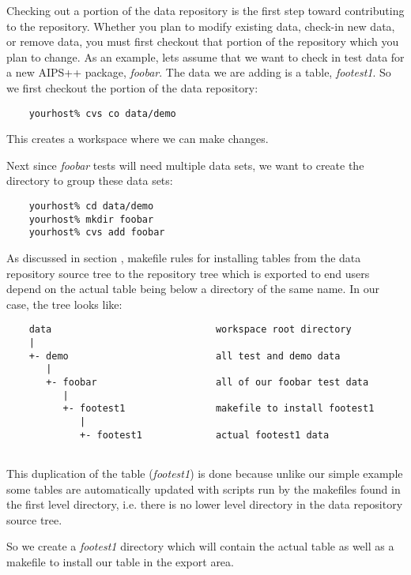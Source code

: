 Checking out a portion of the data repository is the first step toward
contributing to the repository. Whether you plan to modify existing
data, check-in new data, or remove data, you must first checkout that
portion of the repository which you plan to change. As an example, lets
assume that we want to check in test data for a new AIPS++ package,
\textit{foobar}. The data we are adding is a table, \textit{footest1}.
So we first checkout the  portion of the data repository:

\begin{verbatim}
    yourhost% cvs co data/demo
\end{verbatim}

\noindent
This creates a workspace where we can make changes.

Next since \textit{foobar} tests will need multiple data sets, we want to
create the directory to group these data sets:

\begin{verbatim}
    yourhost% cd data/demo
    yourhost% mkdir foobar
    yourhost% cvs add foobar
\end{verbatim}

As discussed in section , makefile rules
for installing tables from the data repository source tree to the repository
tree which is exported to end users depend on the actual table being below
a directory of the same name. In our case, the tree looks like:

\begin{verbatim}
    data                             workspace root directory
    |
    +- demo                          all test and demo data
       |
       +- foobar                     all of our foobar test data
          |
          +- footest1                makefile to install footest1
             |
             +- footest1             actual footest1 data
                     
\end{verbatim}

\noindent
This duplication of the table (\textit{footest1}) is done because unlike
our simple example some tables are automatically updated with scripts run
by the makefiles found in the first level directory, i.e. there is no
lower level directory in the data repository source tree.

So we create a \textit{footest1} directory which will contain the actual
table as well as a makefile to install our table in the export area.

